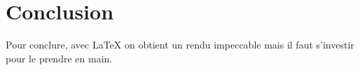 \section*{Conclusion}

Pour conclure, avec \LaTeX{} on obtient un rendu impeccable mais il faut s'investir pour le prendre en main.
